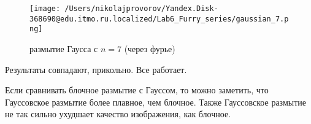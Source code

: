 \begin{figure}[ht!]
    \centering
    \texttt{[image: /Users/nikolajprovorov/Yandex.Disk-368690@edu.itmo.ru.localized/Lab6\_Furry\_series/gaussian\_7.png]}
    \caption{размытие Гаусса с $n = 7$ (через фурье)}
\end{figure}

Результаты совпадают, прикольно. Все работает.

Если сравнивать блочное размытие с Гауссом, то можно заметить, что Гауссовское размытие более плавное, чем блочное. Также Гауссовское размытие не так сильно ухудшает качество изображения, как блочное.